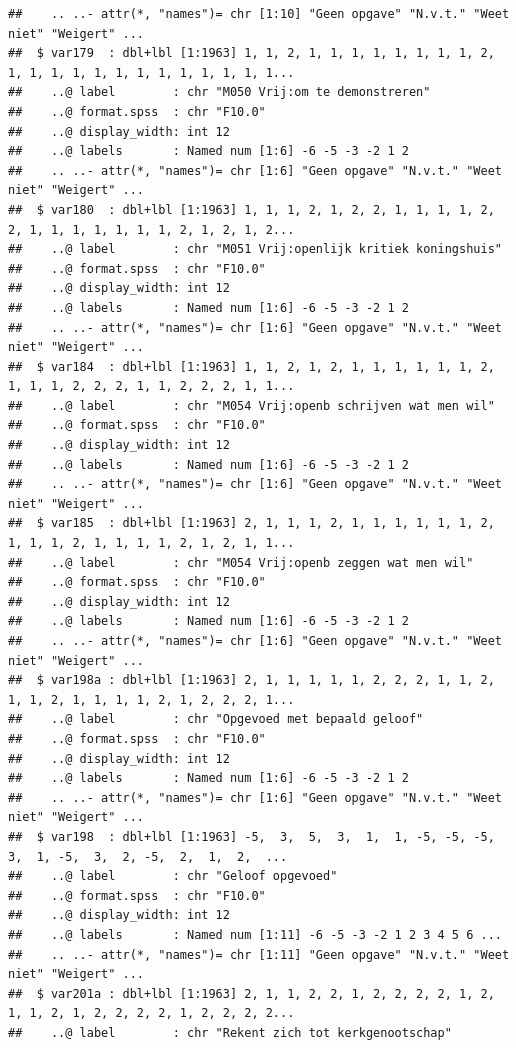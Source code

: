 \documentclass[
]{book}
\begin{document}
\begin{verbatim}
##    .. ..- attr(*, "names")= chr [1:10] "Geen opgave" "N.v.t." "Weet niet" "Weigert" ...
##  $ var179  : dbl+lbl [1:1963] 1, 1, 2, 1, 1, 1, 1, 1, 1, 1, 1, 2, 1, 1, 1, 1, 1, 1, 1, 1, 1, 1, 1, 1, 1...
##    ..@ label        : chr "M050 Vrij:om te demonstreren"
##    ..@ format.spss  : chr "F10.0"
##    ..@ display_width: int 12
##    ..@ labels       : Named num [1:6] -6 -5 -3 -2 1 2
##    .. ..- attr(*, "names")= chr [1:6] "Geen opgave" "N.v.t." "Weet niet" "Weigert" ...
##  $ var180  : dbl+lbl [1:1963] 1, 1, 1, 2, 1, 2, 2, 1, 1, 1, 1, 2, 2, 1, 1, 1, 1, 1, 1, 1, 2, 1, 2, 1, 2...
##    ..@ label        : chr "M051 Vrij:openlijk kritiek koningshuis"
##    ..@ format.spss  : chr "F10.0"
##    ..@ display_width: int 12
##    ..@ labels       : Named num [1:6] -6 -5 -3 -2 1 2
##    .. ..- attr(*, "names")= chr [1:6] "Geen opgave" "N.v.t." "Weet niet" "Weigert" ...
##  $ var184  : dbl+lbl [1:1963] 1, 1, 2, 1, 2, 1, 1, 1, 1, 1, 1, 2, 1, 1, 1, 2, 2, 2, 1, 1, 2, 2, 2, 1, 1...
##    ..@ label        : chr "M054 Vrij:openb schrijven wat men wil"
##    ..@ format.spss  : chr "F10.0"
##    ..@ display_width: int 12
##    ..@ labels       : Named num [1:6] -6 -5 -3 -2 1 2
##    .. ..- attr(*, "names")= chr [1:6] "Geen opgave" "N.v.t." "Weet niet" "Weigert" ...
##  $ var185  : dbl+lbl [1:1963] 2, 1, 1, 1, 2, 1, 1, 1, 1, 1, 1, 2, 1, 1, 1, 2, 1, 1, 1, 1, 2, 1, 2, 1, 1...
##    ..@ label        : chr "M054 Vrij:openb zeggen wat men wil"
##    ..@ format.spss  : chr "F10.0"
##    ..@ display_width: int 12
##    ..@ labels       : Named num [1:6] -6 -5 -3 -2 1 2
##    .. ..- attr(*, "names")= chr [1:6] "Geen opgave" "N.v.t." "Weet niet" "Weigert" ...
##  $ var198a : dbl+lbl [1:1963] 2, 1, 1, 1, 1, 1, 2, 2, 2, 1, 1, 2, 1, 1, 2, 1, 1, 1, 1, 2, 1, 2, 2, 2, 1...
##    ..@ label        : chr "Opgevoed met bepaald geloof"
##    ..@ format.spss  : chr "F10.0"
##    ..@ display_width: int 12
##    ..@ labels       : Named num [1:6] -6 -5 -3 -2 1 2
##    .. ..- attr(*, "names")= chr [1:6] "Geen opgave" "N.v.t." "Weet niet" "Weigert" ...
##  $ var198  : dbl+lbl [1:1963] -5,  3,  5,  3,  1,  1, -5, -5, -5,  3,  1, -5,  3,  2, -5,  2,  1,  2,  ...
##    ..@ label        : chr "Geloof opgevoed"
##    ..@ format.spss  : chr "F10.0"
##    ..@ display_width: int 12
##    ..@ labels       : Named num [1:11] -6 -5 -3 -2 1 2 3 4 5 6 ...
##    .. ..- attr(*, "names")= chr [1:11] "Geen opgave" "N.v.t." "Weet niet" "Weigert" ...
##  $ var201a : dbl+lbl [1:1963] 2, 1, 1, 2, 2, 1, 2, 2, 2, 2, 1, 2, 1, 1, 2, 1, 2, 2, 2, 2, 1, 2, 2, 2, 2...
##    ..@ label        : chr "Rekent zich tot kerkgenootschap"

\end{verbatim}
\end{document}
